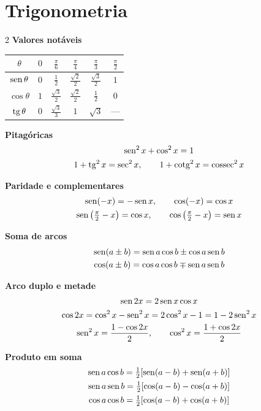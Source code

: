 \section{Trigonometria}
\begin{multicols}{2}\small
\textbf{Valores notáveis}

\begin{tabular}{c|ccccc}
$\theta$ & $0$ & $\frac\pi6$ & $\frac\pi4$ & $\frac\pi3$ & $\frac\pi2$\\\hline
$\operatorname{sen}\theta$ & $0$ & $\frac12$ & $\frac{\sqrt2}2$ & $\frac{\sqrt3}2$ & $1$\\
$\cos\theta$ & $1$ & $\frac{\sqrt3}2$ & $\frac{\sqrt2}2$ & $\frac12$ & $0$\\
$\operatorname{tg}\theta$ & $0$ & $\frac{\sqrt3}3$ & $1$ & $\sqrt3$ & ---
\end{tabular}

\textbf{Pitagóricas}
\begin{gather*}
\operatorname{sen}^2x+\cos^2x=1\\
1+\operatorname{tg}^2x=\sec^2x,\qquad 1+\operatorname{cotg}^2x=\operatorname{cossec}^2x
\end{gather*}

\textbf{Paridade e complementares}
\begin{gather*}
\operatorname{sen}(-x)=-\operatorname{sen} x,\qquad \cos(-x)=\cos x\\
\operatorname{sen}\big(\tfrac\pi2-x\big)=\cos x,\qquad \cos\big(\tfrac\pi2-x\big)=\operatorname{sen} x
\end{gather*}

\columnbreak
\textbf{Soma de arcos}
\begin{gather*}
\operatorname{sen}(a\pm b)=\operatorname{sen} a\cos b\pm\cos a\operatorname{sen} b\\
\cos(a\pm b)=\cos a\cos b\mp\operatorname{sen} a\operatorname{sen} b
\end{gather*}

\textbf{Arco duplo e metade}
\begin{gather*}
\operatorname{sen}2x=2\operatorname{sen} x\cos x\\
\cos2x=\cos^2x-\operatorname{sen}^2x=2\cos^2x-1=1-2\operatorname{sen}^2x\\
\operatorname{sen}^2x=\frac{1-\cos2x}2,\qquad \cos^2x=\frac{1+\cos2x}2
\end{gather*}

\textbf{Produto em soma}
\begin{gather*}
\operatorname{sen} a\cos b=\tfrac12[\operatorname{sen}(a-b)+\operatorname{sen}(a+b)]\\
\operatorname{sen} a\operatorname{sen} b=\tfrac12[\cos(a-b)-\cos(a+b)]\\
\cos a\cos b=\tfrac12[\cos(a-b)+\cos(a+b)]
\end{gather*}
\end{multicols}

